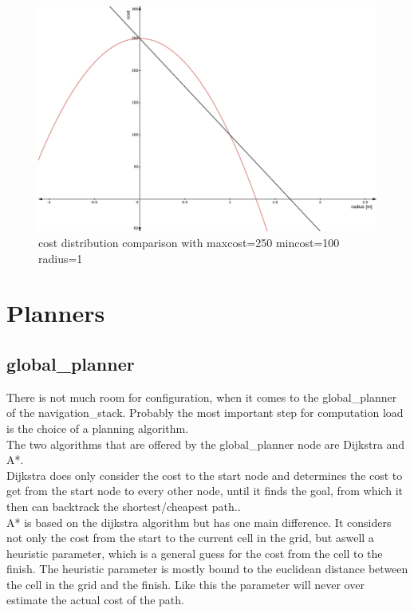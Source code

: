 \begin{figure}[H]
	\begin{center}
	\includegraphics[width=140mm]{Pictures/linear cost comparison}
	\caption{cost distribution comparison with maxcost=250 mincost=100 radius=1}
	\end{center}
\end{figure}


\section{Planners}

\subsection{global\_planner}
There is not much room for configuration, when it comes to the global\_planner of the navigation\_stack. Probably the most important step for computation load is the choice of a planning algorithm.\\
The two algorithms that are offered by the global\_planner node are Dijkstra and A*.\\

Dijkstra does only consider the cost to the start node and determines the cost to get from the start node to every other node, until it finds the goal, from which it then can backtrack the shortest/cheapest path.\cite{AlgorithmenundDatenstrukturen}.\\

A* is based on the dijkstra algorithm but has one main difference. It considers not only the cost from the start to the current cell in the grid, but aswell a heuristic parameter, which is a general guess for the cost from the cell to the finish. The heuristic parameter is mostly bound to the euclidean distance between the cell in the grid and the finish. Like this the parameter will never over estimate the actual cost of the path\cite{AlgorithmenundDatenstrukturen}.\\

